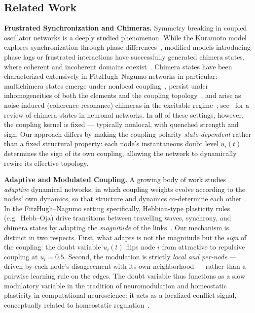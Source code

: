 ﻿\documentclass[11pt]{article}
\begin{document}
\subsection{Related Work}
\label{sec:related}
\textbf{Frustrated Synchronization and Chimeras.} Symmetry breaking in coupled oscillator networks is a deeply studied phenomenon. While the Kuramoto model explores synchronization through phase differences~\cite{acebrn2005}, modified models introducing phase lags or frustrated interactions have successfully generated chimera states, where coherent and incoherent domains coexist~\cite{abrams2004}. Chimera states have been characterized extensively in FitzHugh--Nagumo networks in particular: multichimera states emerge under nonlocal coupling~\cite{omelchenko2013}, persist under inhomogeneities of both the elements and the coupling topology~\cite{omelchenko2015}, and arise as noise-induced (coherence-resonance) chimeras in the excitable regime~\cite{semenova2016}; see~\cite{majhi2019} for a review of chimera states in neuronal networks. In all of these settings, however, the coupling kernel is fixed --- typically nonlocal, with quenched strength and sign. Our approach differs by making the coupling polarity \emph{state-dependent} rather than a fixed structural property: each node's instantaneous doubt level $u_i(t)$ determines the sign of its own coupling, allowing the network to dynamically rewire its effective topology.

\textbf{Adaptive and Modulated Coupling.} A growing body of work studies \emph{adaptive} dynamical networks, in which coupling weights evolve according to the nodes' own dynamics, so that structure and dynamics co-determine each other~\cite{berner2023,gross2008}. In the FitzHugh--Nagumo setting specifically, Hebbian-type plasticity rules (e.g.\ Hebb--Oja) drive transitions between travelling waves, synchrony, and chimera states by adapting the \emph{magnitude} of the links~\cite{provata2026}. Our mechanism is distinct in two respects. First, what adapts is not the magnitude but the \emph{sign} of the coupling: the doubt variable $u_i(t)$ flips node $i$ from attractive to repulsive coupling at $u_i = 0.5$. Second, the modulation is strictly \emph{local and per-node} --- driven by each node's disagreement with its own neighborhood --- rather than a pairwise learning rule on the edges. The doubt variable thus functions as a slow modulatory variable in the tradition of neuromodulation and homeostatic plasticity in computational neuroscience: it acts as a localized conflict signal, conceptually related to homeostatic regulation~\cite{friston2010}.
\end{document}
